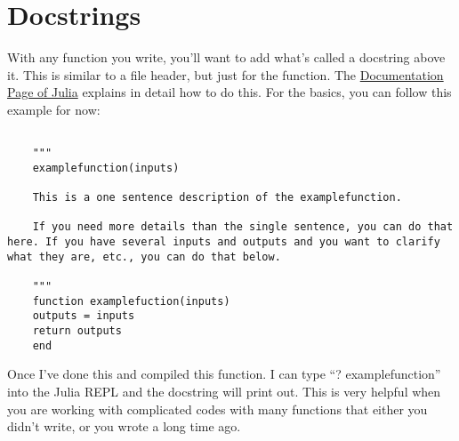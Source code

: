 \documentclass{article}%
\begin{document}
	
	\section{Docstrings}
	
	With any function you write, you'll want to add what's called a docstring above it. This is similar to a file header, but just for the function.  The \href{https://docs.julialang.org/en/v1/manual/documentation/index.html#Accessing-Documentation-1}{Documentation Page of Julia} explains in detail how to do this. For the basics, you can follow this example for now:
	
	\begin{lstlisting}[frame=single]
	
	"""
	examplefunction(inputs)
	
	This is a one sentence description of the examplefunction.
	
	If you need more details than the single sentence, you can do that here. If you have several inputs and outputs and you want to clarify what they are, etc., you can do that below.
	
	"""
	function examplefuction(inputs)
	outputs = inputs
	return outputs
	end
	\end{lstlisting}
	
	Once I've done this and compiled this function. I can type ``? examplefunction'' into the Julia REPL and the docstring will print out. This is very helpful when you are working with complicated codes with many functions that either you didn't write, or you wrote a long time ago.
	
\end{document}
